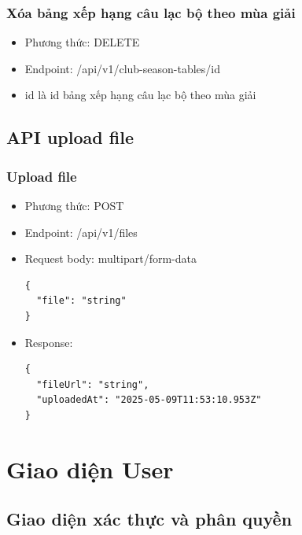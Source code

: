 \documentclass[../BTL.tex]{subfiles}
\begin{document}
\subsubsection{ Xóa bảng xếp hạng câu lạc bộ theo mùa giải}
\begin{itemize}
    \item Phương thức: DELETE
    \item Endpoint: /api/v1/club-season-tables/{id}
    \item {id} là id bảng xếp hạng câu lạc bộ theo mùa giải
\end{itemize}

\subsection{ API upload file}
\subsubsection{ Upload file}
\begin{itemize}
    \item Phương thức: POST
    \item Endpoint: /api/v1/files
    \item Request body: multipart/form-data
        \begin{verbatim}
{
  "file": "string"
}
        \end{verbatim}
    \item Response:
        \begin{verbatim}
{
  "fileUrl": "string",
  "uploadedAt": "2025-05-09T11:53:10.953Z"
}
        \end{verbatim}
\end{itemize}
\section{ Giao diện User}
\subsection{ Giao diện xác thực và phân quyền}
\end{document}
